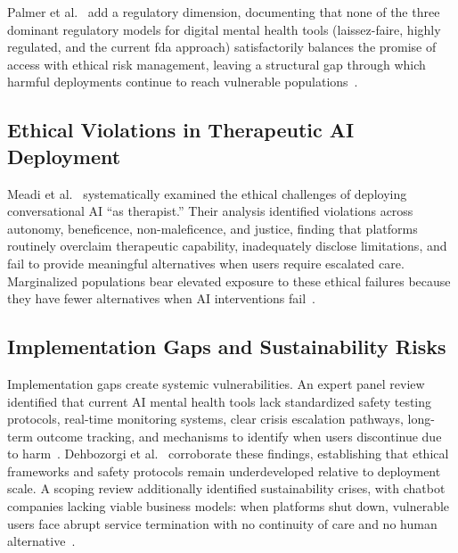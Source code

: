 Palmer et al.~\cite{palmer_2025} add a regulatory dimension, documenting that none of the three dominant regulatory models for digital mental health tools (laissez-faire, highly regulated, and the current \gls{fda} approach) satisfactorily balances the promise of access with ethical risk management, leaving a structural gap through which harmful deployments continue to reach vulnerable populations~\cite{palmer_2025}.

\subsection{Ethical Violations in Therapeutic AI Deployment}

Meadi et al.~\cite{meadi_2025} systematically examined the ethical challenges of deploying conversational AI ``as therapist.'' Their analysis identified violations across autonomy, beneficence, non-maleficence, and justice, finding that platforms routinely overclaim therapeutic capability, inadequately disclose limitations, and fail to provide meaningful alternatives when users require escalated care. Marginalized populations bear elevated exposure to these ethical failures because they have fewer alternatives when AI interventions fail~\cite{meadi_2025}.

\subsection{Implementation Gaps and Sustainability Risks}

Implementation gaps create systemic vulnerabilities. An expert panel review identified that current AI mental health tools lack standardized safety testing protocols, real-time monitoring systems, clear crisis escalation pathways, long-term outcome tracking, and mechanisms to identify when users discontinue due to harm~\cite{smith_2023}. Dehbozorgi et al.~\cite{dehbozorgi_2025} corroborate these findings, establishing that ethical frameworks and safety protocols remain underdeveloped relative to deployment scale. A scoping review additionally identified sustainability crises, with chatbot companies lacking viable business models: when platforms shut down, vulnerable users face abrupt service termination with no continuity of care and no human alternative~\cite{casu_2024}.
